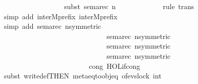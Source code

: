 \begin{isabellebody}
\ \ \ \ \ \ \ \ \ \ \ \ \ \ \ \ \ subst\ sema{\isacharunderscore}{\kern0pt}rec{\isacharbrackleft}{\kern0pt}\ n{\isacharequal}{\kern0pt}{\isacartoucheopen}{}{\isacartoucheclose}{\isacharbrackright}{\kern0pt}{\isacharparenright}{\kern0pt}\ \isanewline
\ \ \ \ \ \ \ \ \ \ \ \isamarkupfalse%
{\isacharparenleft}{\kern0pt}rule\ trans{\isacharparenright}{\kern0pt}\isanewline
\ \ \ \ \ \ \ \ \ \ \ \ \isamarkupfalse%
{\isacharparenleft}{\kern0pt}simp\ add{\isacharcolon}{\kern0pt}\ inter{}Mprefix{}\ inter{}Mprefix{}{\isacharparenright}{\kern0pt}\isanewline
\ \ \ \ \ \ \ \ \ \ \ \ \ \isamarkupfalse%
{\isacharparenleft}{\kern0pt}simp\ add{\isacharcolon}{\kern0pt}\ sema{\isacharunderscore}{\kern0pt}rec{\isacharbrackleft}{\kern0pt}\ n{\isacharequal}{\kern0pt}{\isacartoucheopen}{}{\isacartoucheclose}{\isacharcomma}{\kern0pt}symmetric{\isacharbrackright}{\kern0pt}\ \isanewline
\ \ \ \ \ \ \ \ \ \ \ \ \ \ \ \ \ \ \ \ \ \ \ \ \ \ \ \ \ sema{\isacharunderscore}{\kern0pt}rec{\isacharbrackleft}{\kern0pt}\ n{\isacharequal}{\kern0pt}{\isacartoucheopen}{}{\isacartoucheclose}{\isacharcomma}{\kern0pt}symmetric{\isacharbrackright}{\kern0pt}\ \isanewline
\ \ \ \ \ \ \ \ \ \ \ \ \ \ \ \ \ \ \ \ \ \ \ \ \ \ \ \ \ sema{\isacharunderscore}{\kern0pt}rec{\isacharbrackleft}{\kern0pt}\ n{\isacharequal}{\kern0pt}{\isacartoucheopen}{}{\isacartoucheclose}{\isacharcomma}{\kern0pt}symmetric{\isacharbrackright}{\kern0pt}\ \isanewline
\ \ \ \ \ \ \ \ \ \ \ \ \ \ \ \ \ \ \ \ \ \ \ \ \ \ \ \ \ sema{\isacharunderscore}{\kern0pt}rec{\isacharbrackleft}{\kern0pt}\ n{\isacharequal}{\kern0pt}{\isacartoucheopen}{}{\isacartoucheclose}{\isacharcomma}{\kern0pt}symmetric{\isacharbrackright}{\kern0pt}\ \isanewline
\ \ \ \ \ \ \ \ \ \ \ \ \ \ \ \ \ \ \ \ \ \ \ \ cong{\isacharcolon}{\kern0pt}\ HOL{\isachardot}{\kern0pt}if{\isacharunderscore}{\kern0pt}cong{\isacharparenright}{\kern0pt}\isanewline
\ \ \ \ \ \ \ \ \ \ \ \ \ \isamarkupfalse%
{\isacharparenleft}{\kern0pt}subst\ write{}{\isacharunderscore}{\kern0pt}def{\isacharbrackleft}{\kern0pt}THEN\ meta{\isacharunderscore}{\kern0pt}eq{\isacharunderscore}{\kern0pt}to{\isacharunderscore}{\kern0pt}obj{\isacharunderscore}{\kern0pt}eq{\isacharcomma}{\kern0pt}\ of{\isachardoublequoteopen}evs{\isachardot}{\kern0pt}lock\ {\isacharparenleft}{\kern0pt}{}{\isacharcolon}{\kern0pt}{\isacharcolon}{\kern0pt}int{\isacharparenright}{\kern0pt}{\isachardoublequoteclose}{\isacharbrackright}{\kern0pt}{\isacharparenright}{\kern0pt}\isanewline

\end{isabellebody}
